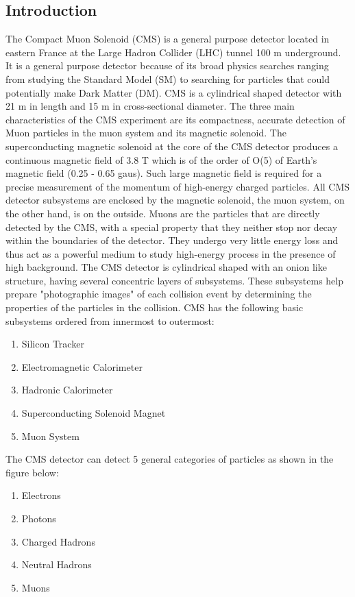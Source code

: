 \subsection{Introduction}
The Compact Muon Solenoid (CMS) is a general purpose detector located in eastern France at the Large Hadron Collider (LHC) tunnel 100 m underground. It is a general purpose detector because of its broad physics searches ranging from studying the Standard Model (SM) to searching for particles that could potentially make Dark Matter (DM). CMS is a cylindrical shaped detector with 21 m in length and 15 m in cross-sectional diameter. The three main characteristics of the CMS experiment are its compactness, accurate detection of Muon particles in the muon system and its magnetic solenoid. The superconducting magnetic solenoid at the core of the CMS detector produces a continuous magnetic field of 3.8 T which is of the order of O(5) of Earth's magnetic field (0.25 - 0.65 gaus). Such large magnetic field is required for a precise measurement of the momentum of high-energy charged particles. All CMS detector subsystems are enclosed by the magnetic solenoid, the muon system, on the other hand, is on the outside. Muons are the particles that are directly detected by the CMS, with a special property that they neither stop nor decay within the boundaries of the detector. They undergo very little energy loss and thus act as a powerful medium to study high-energy process in the presence of high background.
The CMS detector is cylindrical shaped with an onion like structure, having several concentric layers of subsystems. These subsystems help prepare "photographic images" of each collision event by determining the properties of the particles in the collision. CMS has the following basic subsystems ordered from innermost to outermost:

\begin{enumerate}
    \item Silicon Tracker
    \item Electromagnetic Calorimeter
    \item Hadronic Calorimeter
    \item Superconducting Solenoid Magnet
    \item Muon System
    
    
\end{enumerate}
The CMS detector can detect 5 general categories of particles as shown in the figure below:
 \begin{enumerate}
    \item Electrons
    \item Photons
    \item Charged Hadrons
    \item Neutral Hadrons
    \item Muons
\end{enumerate}

